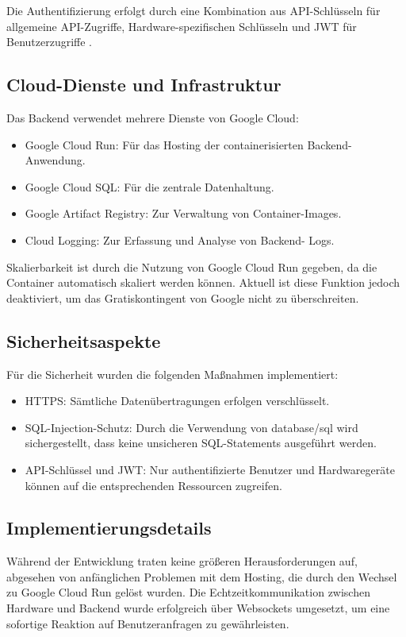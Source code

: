 Die Authentifizierung erfolgt durch eine Kombination aus API-Schlüsseln für allgemeine API-Zugriffe, 
Hardware-spezifischen Schlüsseln und JWT für Benutzerzugriffe .

\subsection{Cloud-Dienste und Infrastruktur}

Das Backend verwendet mehrere Dienste von Google Cloud:
\begin{itemize}
	\item Google Cloud Run: Für das Hosting der containerisierten Backend-Anwendung.
	\item Google Cloud SQL: Für die zentrale Datenhaltung.
	\item Google Artifact Registry: Zur Verwaltung von Container-Images.
	\item Cloud Logging: Zur Erfassung und Analyse von Backend- Logs.
\end{itemize}

Skalierbarkeit ist durch die Nutzung von Google Cloud Run gegeben, da die Container automatisch 
skaliert werden können. Aktuell ist diese Funktion jedoch deaktiviert, um das Gratiskontingent von 
Google nicht zu überschreiten.


\subsection{Sicherheitsaspekte}

Für die Sicherheit wurden die folgenden Maßnahmen implementiert:
\begin{itemize}
	\item HTTPS: Sämtliche Datenübertragungen erfolgen verschlüsselt.
	\item SQL-Injection-Schutz: Durch die Verwendung von database/sql wird sichergestellt, dass keine 
unsicheren SQL-Statements ausgeführt werden.
	\item API-Schlüssel und JWT: Nur authentifizierte Benutzer und Hardwaregeräte können auf die 
entsprechenden Ressourcen zugreifen.
\end{itemize}


\subsection{Implementierungsdetails}

Während der Entwicklung traten keine größeren Herausforderungen auf, abgesehen von anfänglichen 
Problemen mit dem Hosting, die durch den Wechsel zu Google Cloud Run gelöst wurden. Die 
Echtzeitkommunikation zwischen Hardware und Backend wurde erfolgreich über Websockets umgesetzt, 
um eine sofortige Reaktion auf Benutzeranfragen zu gewährleisten.


